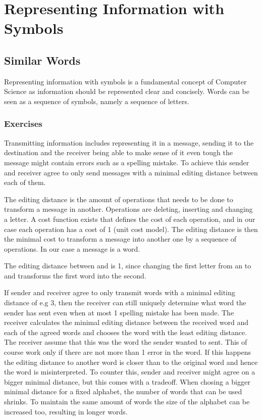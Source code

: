 \chapter{Representing Information with Symbols}
\label{chapter:representingInformationWithWymbols}

\section{Similar Words}
\label{section:similarWords}

Representing information with symbols is a fundamental concept of Computer Science as information should be represented clear and concisely. Words can be seen as a sequence of symbols, namely a sequence of letters.

\subsection{Exercises}

Transmitting information includes representing it in a message, sending it to the destination and the receiver being able to make sense of it even tough the message might contain errors such as a spelling mistake. To achieve this sender and receiver agree to only send messages with a minimal editing distance \cite{AnD} between each of them. 

The editing distance is the amount of operations that needs to be done to transform a message in another. Operations are deleting, inserting and changing a letter. 
A cost function exists that defines the cost of each operation, and in our case each operation has a cost of 1 (unit cost model). The editing distance is then the minimal cost to transform a message into another one by a sequence of operations. In our case a message is a word.

\begin{example}
    The editing distance between  and  is 1, since changing the first letter from an  to and  transforms the first word into the second.
\end{example}

If sender and receiver agree to only transmit words with a minimal editing distance of e.g 3, then the receiver can still uniquely determine what word the sender has sent even when at most 1 spelling mistake has been made. The receiver calculates the minimal editing distance between the received word and each of the agreed words and chooses the word with the least editing distance.
The receiver assume that this was the word the sender wanted to sent. This of course work only if there are not more than 1 error in the word. If this happens the editing distance to another word is closer than to the original word and hence the word is misinterpreted. To counter this, sender and receiver might agree on a bigger minimal distance, but this comes with a tradeoff. When chosing a bigger minimal distance for a fixed alphabet, the number of words that can be used shrinks. To maintain the same amount of words the size of the alphabet can be increased too, resulting in longer words.

